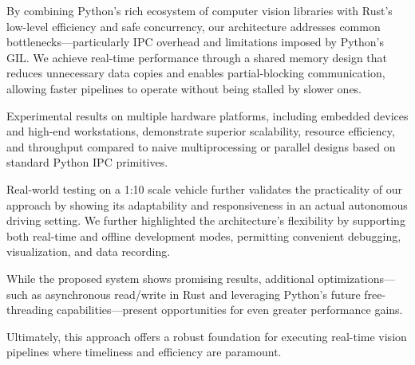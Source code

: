 \documentclass[conference]{IEEEtran}
\begin{document}
By combining Python’s rich ecosystem of computer vision libraries with Rust’s low-level efficiency and safe concurrency, our architecture addresses common bottlenecks—particularly IPC overhead and limitations imposed by Python’s GIL. We achieve real-time performance through a shared memory design that reduces unnecessary data copies and enables partial-blocking communication, allowing faster pipelines to operate without being stalled by slower ones.

Experimental results on multiple hardware platforms, including embedded devices and high-end workstations, demonstrate superior scalability, resource efficiency, and throughput compared to naive multiprocessing or parallel designs based on standard Python IPC primitives.

Real-world testing on a 1:10 scale vehicle further validates the practicality of our approach by showing its adaptability and responsiveness in an actual autonomous driving setting.
We further highlighted the architecture’s flexibility by supporting both real-time and offline development modes, permitting convenient debugging, visualization, and data recording.

While the proposed system shows promising results, additional optimizations—such as asynchronous read/write in Rust and leveraging Python’s future free-threading capabilities—present opportunities for even greater performance gains.

Ultimately, this approach offers a robust foundation for executing real-time vision pipelines where timeliness and efficiency are paramount.




\end{document}
